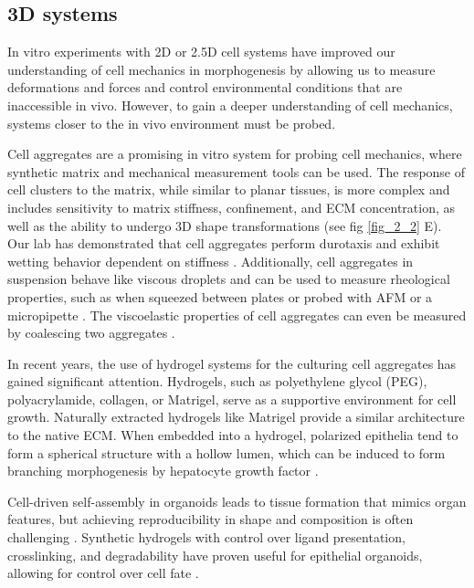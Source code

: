 \hypertarget{d-systems}{%
\subsection{3D systems}\label{d-systems}}

In vitro experiments with 2D or 2.5D cell systems have improved our understanding of cell mechanics in morphogenesis by allowing us to measure deformations and forces and control environmental conditions that are inaccessible in vivo. However, to gain a deeper understanding of cell mechanics, systems closer to the in vivo environment must be probed.

Cell aggregates are a promising in vitro system for probing cell mechanics, where synthetic matrix and mechanical measurement tools can be used. The response of cell clusters to the matrix, while similar to planar tissues, is more complex and includes sensitivity to matrix stiffness, confinement, and ECM concentration, as well as the ability to undergo 3D shape transformations (see fig \ref{fig_2_2} E). Our lab has demonstrated that cell aggregates perform durotaxis and exhibit wetting behavior dependent on stiffness \cite{perez-gonzalez2019, pallares2022}. Additionally, cell aggregates in suspension behave like viscous droplets and can be used to measure rheological properties, such as when squeezed between plates or probed with AFM or a micropipette \cite{xi2018}. The viscoelastic properties of cell aggregates can even be measured by coalescing two aggregates
\cite{oriola2022}.

In recent years, the use of hydrogel systems for the culturing cell aggregates has gained significant attention. Hydrogels, such as polyethylene glycol (PEG), polyacrylamide, collagen, or Matrigel, serve as a supportive environment for cell growth. Naturally extracted hydrogels like Matrigel provide a similar architecture to the native ECM. When embedded into a hydrogel, polarized epithelia tend to form a spherical structure with a hollow lumen, which can be induced to form branching morphogenesis by hepatocyte growth factor \cite{bryant2008}. 

Cell-driven self-assembly in organoids leads to tissue formation that mimics organ features, but achieving reproducibility in shape and composition is often challenging \cite{nelson2008, hofer2021}. Synthetic hydrogels with control over ligand presentation, crosslinking, and degradability have proven useful for epithelial organoids, allowing for control over cell fate \cite{gjorevski2016, gjorevski2022}.

